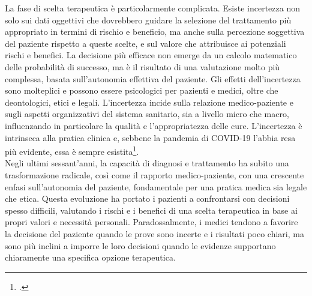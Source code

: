 La fase di scelta terapeutica è particolarmente complicata. Esiste incertezza non solo sui dati oggettivi che dovrebbero guidare la selezione del trattamento più appropriato in termini di rischio e beneficio, ma anche sulla percezione soggettiva del paziente rispetto a queste scelte, e sul valore che attribuisce ai potenziali rischi e benefici. La decisione più efficace non emerge da un calcolo matematico delle probabilità di successo, ma è il risultato di una valutazione molto più complessa, basata sull'autonomia effettiva del paziente. 
Gli effetti dell'incertezza sono molteplici e possono essere psicologici per pazienti e medici, oltre che deontologici, etici e legali. L'incertezza incide sulla relazione medico-paziente e sugli aspetti organizzativi del sistema sanitario, sia a livello micro che macro, influenzando in particolare la qualità e l'appropriatezza delle cure.
L'incertezza è intrinseca alla pratica clinica e, sebbene la pandemia di COVID-19 l'abbia resa più evidente, essa è sempre esistita\footcite{womak:recenti-progressi-medicina}.\\

Negli ultimi sessant'anni, la capacità di diagnosi e trattamento ha subito una trasformazione radicale, così come il rapporto medico-paziente, con una crescente enfasi sull'autonomia del paziente, fondamentale per una pratica medica sia legale che etica. Questa evoluzione ha portato i pazienti a confrontarsi con decisioni spesso difficili, valutando i rischi e i benefici di una scelta terapeutica in base ai propri valori e necessità personali. Paradossalmente, i medici tendono a favorire la decisione del paziente quando le prove sono incerte e i risultati poco chiari, ma sono più inclini a imporre le loro decisioni quando le evidenze supportano chiaramente una specifica opzione terapeutica.



